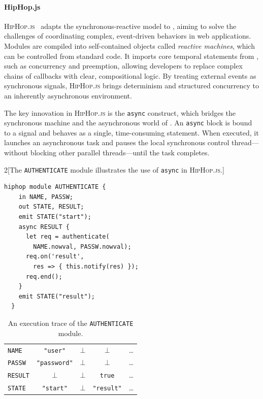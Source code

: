 \paragraph*{HipHop.js}
\textsc{HipHop.js}~\cite{DBLP:conf/pldi/BerryS20} adapts the synchronous-reactive model to
\JavaScript, aiming to solve the challenges of coordinating complex, event-driven behaviors in web
applications. Modules are compiled into self-contained objects called \emph{reactive machines},
which can be controlled from standard \JavaScript code. It imports core temporal statements from
\Esterel, such as concurrency and preemption, allowing developers to replace complex chains of
callbacks with clear, compositional logic.  By treating external events as synchronous signals,
\textsc{HipHop.js} brings determinism and structured concurrency to an inherently asynchronous
environment.

The key innovation in \textsc{HipHop.js} is the \texttt{async} construct, which bridges the
synchronous machine and the asynchronous world of \JavaScript. An \texttt{async} block is bound to a
signal and behaves as a single, time-consuming statement. When executed, it launches an asynchronous
task and pauses the local synchronous control thread—without blocking other parallel threads—until
the task completes.

\begin{multicols}{2}[The \texttt{AUTHENTICATE} module illustrates the use of \texttt{async} in
    \textsc{HipHop.js}.]
  \begin{lstlisting}[basicstyle=\ttfamily\footnotesize\color{BlackText}]
  hiphop module AUTHENTICATE {
    in NAME, PASSW;
    out STATE, RESULT;
    emit STATE("start");
    async RESULT {
      let req = authenticate(
        NAME.nowval, PASSW.nowval);
      req.on('result',
        res => { this.notify(res) });
      req.end();
    }
    emit STATE("result");
  }
\end{lstlisting}
  \newcolumn
  \begin{table}[H]
    \centering
    \begin{tabular}{l|cccc}
      \texttt{NAME}   & \texttt{"user"}     & $\bot$ & $\bot$            & \dots \\
      \texttt{PASSW}  & \texttt{"password"} & $\bot$ & $\bot$            & \dots \\
      \texttt{RESULT} & $\bot$              & $\bot$ & \texttt{true}     & \dots \\
      \texttt{STATE}  & \texttt{"start"}    & $\bot$ & \texttt{"result"} & \dots \\
    \end{tabular}
    \caption{An execution trace of the \texttt{AUTHENTICATE} module.}
    \label{tab:sota:synchronous:hiphop:exec}
  \end{table}
\end{multicols}

